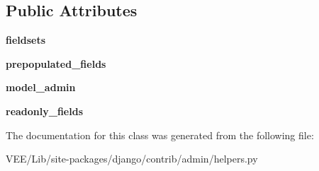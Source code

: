 \subsection*{Public Attributes}
\begin{DoxyCompactItemize}
\item 
\mbox{\label{classdjango_1_1contrib_1_1admin_1_1helpers_1_1_admin_form_ae9da2f1d9bb6ad2ebf2114db235f094f}} 
{\bfseries fieldsets}
\item 
\mbox{\label{classdjango_1_1contrib_1_1admin_1_1helpers_1_1_admin_form_afee98f6299caa5e2b94ddfa0f088ae86}} 
{\bfseries prepopulated\+\_\+fields}
\item 
\mbox{\label{classdjango_1_1contrib_1_1admin_1_1helpers_1_1_admin_form_a7c0dfa7381f1f31f4c9447c7ef086cfc}} 
{\bfseries model\+\_\+admin}
\item 
\mbox{\label{classdjango_1_1contrib_1_1admin_1_1helpers_1_1_admin_form_afe0e049185db254ca343f3d686532f46}} 
{\bfseries readonly\+\_\+fields}
\end{DoxyCompactItemize}


The documentation for this class was generated from the following file\+:\begin{DoxyCompactItemize}
\item 
V\+E\+E/\+Lib/site-\/packages/django/contrib/admin/helpers.\+py\end{DoxyCompactItemize}
